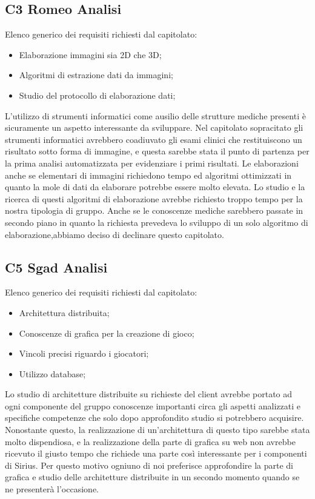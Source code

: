 \subsection{C3 Romeo Analisi}
Elenco generico dei requisiti richiesti dal capitolato:
\begin{itemize} 
\item Elaborazione immagini sia 2D che 3D;
\item Algoritmi di estrazione dati da immagini;
\item Studio del protocollo di elaborazione dati;
\end{itemize}
L'utilizzo di strumenti informatici come ausilio delle strutture mediche presenti è sicuramente un aspetto interessante da sviluppare. Nel capitolato sopracitato gli strumenti informatici avrebbero coadiuvato gli esami clinici che restituiscono un risultato sotto forma di immagine, e questa sarebbe stata il punto di partenza per la prima analisi automatizzata per evidenziare i primi risultati. Le elaborazioni anche se elementari di immagini richiedono tempo ed algoritmi ottimizzati in quanto la mole di dati da elaborare potrebbe essere molto elevata. Lo studio e la ricerca di questi algoritmi di elaborazione avrebbe richiesto troppo tempo per la nostra tipologia di gruppo. Anche se le conoscenze mediche sarebbero passate in secondo piano in quanto la richiesta prevedeva lo sviluppo di un solo algoritmo di elaborazione,abbiamo deciso di declinare questo capitolato.   \\
\subsection{C5 Sgad Analisi}
Elenco generico dei requisiti richiesti dal capitolato:
\begin{itemize} 
\item Architettura distribuita;
\item Conoscenze di grafica per la creazione di gioco;
\item Vincoli precisi riguardo i giocatori;
\item Utilizzo database;
\end{itemize}
Lo studio di architetture distribuite su richieste del client avrebbe portato ad ogni componente del gruppo conoscenze importanti circa gli aspetti analizzati e specifiche competenze che solo dopo approfondito studio si potrebbero acquisire. Nonostante questo, la realizzazione di un'architettura di questo tipo sarebbe stata molto dispendiosa, e la realizzazione della parte di grafica su web non avrebbe ricevuto il giusto tempo che richiede una parte così interessante per i componenti di Sirius. Per questo motivo ogniuno di noi preferisce approfondire la parte di grafica e studio delle architetture distribuite in un secondo momento quando se ne presenterà l'occasione.\\
